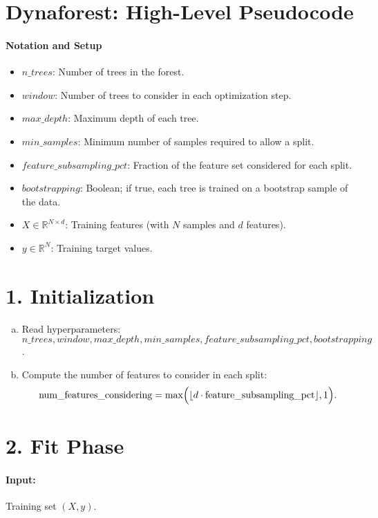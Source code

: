 \documentclass{article}
\begin{document}
\section*{Dynaforest: High-Level Pseudocode}

\paragraph{Notation and Setup}
\begin{itemize}
    \item $n\_trees$: Number of trees in the forest.
    \item $window$: Number of trees to consider in each optimization step.
    \item $max\_depth$: Maximum depth of each tree.
    \item $min\_samples$: Minimum number of samples required to allow a split.
    \item $feature\_subsampling\_pct$: Fraction of the feature set considered for each split.
    \item $bootstrapping$: Boolean; if true, each tree is trained on a bootstrap sample of the data.
    \item $X \in \mathbb{R}^{N \times d}$: Training features (with $N$ samples and $d$ features).
    \item $y \in \mathbb{R}^{N}$: Training target values.
\end{itemize}

\section*{1. Initialization}
\begin{enumerate}[(a)]
    \item Read hyperparameters: $n\_trees, window, max\_depth, min\_samples, feature\_subsampling\_pct, bootstrapping$.
    \item Compute the number of features to consider in each split:
    \[
        \text{num\_features\_considering} = 
        \max\Bigl(\lfloor d \cdot \text{feature\_subsampling\_pct} \rfloor, 1\Bigr).
    \]
\end{enumerate}

\section*{2. Fit Phase}

\paragraph{Input:} Training set $(X, y)$.
\end{document}
